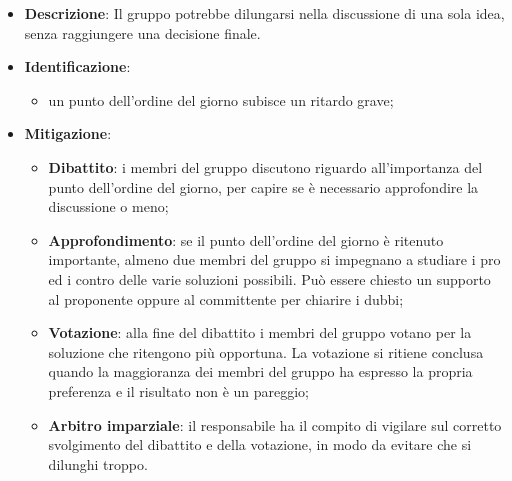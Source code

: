 \label{risk:conflitti decisionali}
\begin{itemize}
	\item \textbf{Descrizione}:
	      Il gruppo potrebbe dilungarsi nella discussione di una sola idea, senza
	      raggiungere una decisione finale.
	\item \textbf{Identificazione}:
	      \begin{itemize}
		      \item un punto dell'ordine del giorno subisce un ritardo grave;
	      \end{itemize}
	\item \textbf{Mitigazione}:
	      \begin{itemize}
		      \item \textbf{Dibattito}: i membri del gruppo discutono riguardo
		            all'importanza del punto dell'ordine del giorno, per capire
		            se è necessario approfondire la discussione o meno;

		      \item \textbf{Approfondimento}: se il punto dell'ordine del
		            giorno è ritenuto importante, almeno due membri del gruppo
		            si impegnano a studiare i pro ed i contro delle varie
		            soluzioni possibili.
		            Può essere chiesto un supporto al proponente oppure al
		            committente per chiarire i dubbi;

		      \item \textbf{Votazione}: alla fine del dibattito i membri del
		            gruppo
		            votano per la soluzione che ritengono più opportuna. La
		            votazione si ritiene conclusa quando la maggioranza dei
		            membri del gruppo ha espresso la propria preferenza e il
		            risultato non è un pareggio;

		      \item \textbf{Arbitro imparziale}: il responsabile ha il compito
		            di vigilare sul corretto svolgimento del dibattito e della
		            votazione, in modo da evitare che si dilunghi troppo.
	      \end{itemize}
\end{itemize}
